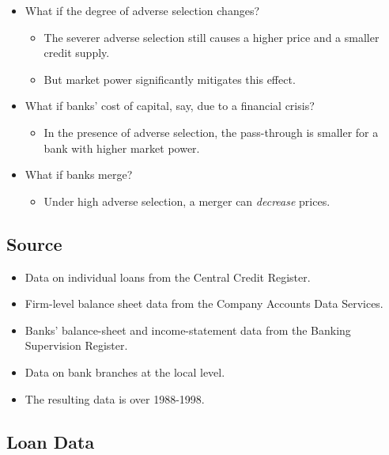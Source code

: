 \documentclass[]{book}
\providecommand{\tightlist}{%
  \setlength{\itemsep}{0pt}\setlength{\parskip}{0pt}}
\begin{document}
\begin{itemize}
\tightlist
\item
  What if the degree of adverse selection changes?

  \begin{itemize}
  \tightlist
  \item
    The severer adverse selection still causes a higher price and a
    smaller credit supply.
  \item
    But market power significantly mitigates this effect.
  \end{itemize}
\item
  What if banks' cost of capital, say, due to a financial crisis?

  \begin{itemize}
  \tightlist
  \item
    In the presence of adverse selection, the pass-through is smaller
    for a bank with higher market power.
  \end{itemize}
\item
  What if banks merge?

  \begin{itemize}
  \tightlist
  \item
    Under high adverse selection, a merger can \emph{decrease} prices.
  \end{itemize}
\end{itemize}

\subsection{Source}\label{source}

\begin{itemize}
\tightlist
\item
  Data on individual loans from the Central Credit Register.
\item
  Firm-level balance sheet data from the Company Accounts Data Services.
\item
  Banks' balance-sheet and income-statement data from the Banking
  Supervision Register.
\item
  Data on bank branches at the local level.
\item
  The resulting data is over 1988-1998.
\end{itemize}

\subsection{Loan Data}\label{loan-data}
\end{document}
